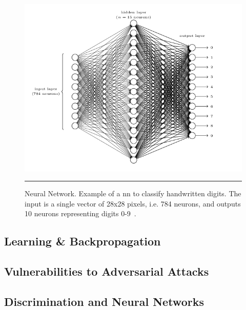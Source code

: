 \begin{figure}[H]
\includegraphics[width=1\textwidth]{media/literature/handwrittenDigitNN.png}
    \rule{35em}{0.5pt}
\caption[Example of a Neural Network]{Neural Network. Example of a \Gls{nn} to
classify handwritten digits. The input is a single vector of 28x28 pixels, i.e. 784 neurons, and outputs
10 neurons representing digits 0-9~\citep{Nielsen2015}.}\label{fig:nn}
\end{figure}


\subsection{Learning \& Backpropagation}


\subsection{Vulnerabilities to Adversarial Attacks}

\subsection{Discrimination and Neural Networks}


